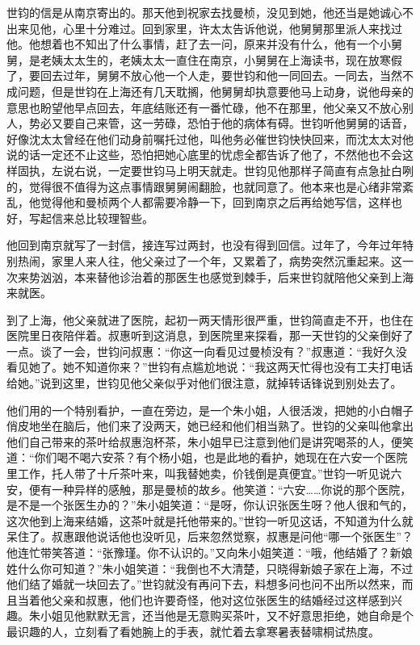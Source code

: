\par 世钧的信是从南京寄出的。那天他到祝家去找曼桢，没见到她，他还当是她诚心不出来见他，心里十分难过。回到家里，许太太告诉他说，他舅舅那里派人来找过他。他想着也不知出了什么事情，赶了去一问，原来并没有什么，他有一个小舅舅，是老姨太太生的，老姨太太一直住在南京，小舅舅在上海读书，现在放寒假了，要回去过年，舅舅不放心他一个人走，要世钧和他一同回去。一同去，当然不成问题，但是世钧在上海还有几天耽搁，他舅舅却执意要他马上动身，说他母亲的意思也盼望他早点回去，年底结账还有一番忙碌，他不在那里，他父亲又不放心别人，势必又要自己来管，这一劳碌，恐怕于他的病体有碍。世钧听他舅舅的话音，好像沈太太曾经在他们动身前嘱托过他，叫他务必催世钧快快回来，而沈太太对他说的话一定还不止这些，恐怕把她心底里的忧虑全都告诉了他了，不然他也不会这样固执，左说右说，一定要世钧马上明天就走。世钧见他那样子简直有点急扯白咧的，觉得很不值得为这点事情跟舅舅闹翻脸，也就同意了。他本来也是心绪非常紊乱，他觉得他和曼桢两个人都需要冷静一下，回到南京之后再给她写信，这样也好，写起信来总比较理智些。
\par 他回到南京就写了一封信，接连写过两封，也没有得到回信。过年了，今年过年特别热闹，家里人来人往，他父亲过了一个年，又累着了，病势突然沉重起来。这一次来势汹汹，本来替他诊治着的那医生也感觉到棘手，后来世钧就陪他父亲到上海来就医。
\par 到了上海，他父亲就进了医院，起初一两天情形很严重，世钧简直走不开，也住在医院里日夜陪伴着。叔惠听到这消息，到医院里来探看，那一天世钧的父亲倒好了一点。谈了一会，世钧问叔惠：“你这一向看见过曼桢没有？”叔惠道：“我好久没看见她了。她不知道你来？”世钧有点尴尬地说：“我这两天忙得也没有工夫打电话给她。”说到这里，世钧见他父亲似乎对他们很注意，就掉转话锋说到别处去了。
\par 他们用的一个特别看护，一直在旁边，是一个朱小姐，人很活泼，把她的小白帽子俏皮地坐在脑后，他们来了没两天，她已经和他们相当熟了。世钧的父亲叫他拿出他们自己带来的茶叶给叔惠泡杯茶，朱小姐早已注意到他们是讲究喝茶的人，便笑道：“你们喝不喝六安茶？有个杨小姐，也是此地的看护，她现在在六安一个医院里工作，托人带了十斤茶叶来，叫我替她卖，价钱倒是真便宜。”世钧一听见说六安，便有一种异样的感触，那是曼桢的故乡。他笑道：“六安……你说的那个医院，是不是一个张医生办的？”朱小姐笑道：“是呀，你认识张医生呀？他人很和气的，这次他到上海来结婚，这茶叶就是托他带来的。”世钧一听见这话，不知道为什么就呆住了。叔惠跟他说话他也没听见，后来忽然觉察，叔惠是问他“哪一个张医生”？他连忙带笑答道：“张豫瑾。你不认识的。”又向朱小姐笑道：“哦，他结婚了？新娘姓什么你可知道？”朱小姐笑道：“我倒也不大清楚，只晓得新娘子家在上海，不过他们结了婚就一块回去了。”世钧就没有再问下去，料想多问也问不出所以然来，而且当着他父亲和叔惠，他们也许要奇怪，他对这位张医生的结婚经过这样感到兴趣。朱小姐见他默默无言，还当他是无意购买茶叶，又不好意思拒绝，她自命是个最识趣的人，立刻看了看她腕上的手表，就忙着去拿寒暑表替啸桐试热度。
